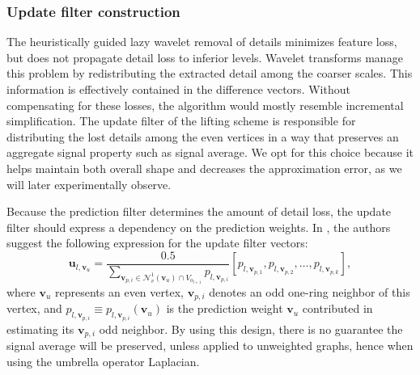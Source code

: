 \documentclass[graybox]{svmult}
\begin{document}
	
	\subsubsection{Update filter construction}
	The heuristically guided lazy wavelet removal of details minimizes feature loss, but does not propagate detail loss to inferior levels. Wavelet transforms manage this problem by redistributing the extracted detail among the coarser scales.  This information is effectively contained in the difference vectors. Without compensating for these losses, the algorithm would mostly resemble incremental simplification. The update filter of the lifting scheme is responsible for distributing the lost details among the even vertices in a way that preserves an aggregate signal property such as signal average. We opt for this choice because it helps maintain both overall shape and decreases the approximation error, as we will later experimentally observe. 
	
	Because the prediction filter determines the amount of detail loss, the update filter should express a dependency on the prediction weights. In \cite{Martinez2011}, the authors suggest the following expression for the update filter vectors:
	\begin{equation}
	\mathbf{u}_{l, \mathbf{v}_{u}} = \frac{0.5}{ \sum\limits_{\mathbf{v}_{p,i} \in \mathcal{N}_v^1(\mathbf{v}_u) \cap V_{o_{l+1}}} {  p_{l, \mathbf{v}_{p,i} } } } \left[ p_{l, \mathbf{v}_{p,1} }, p_{l, \mathbf{v}_{p,2} }, \ldots , p_{l, \mathbf{v}_{p,k} }\right],
	\label{eq_cds:smoothing_update_weights}
	\end{equation}
	where $\mathbf{v}_u$ represents an even vertex, $\mathbf{v}_{p,i}$ denotes an odd one-ring neighbor of this vertex, and $p_{l,\mathbf{v}_{p,i}} \equiv p_{l,\mathbf{v}_{p,i}}(\mathbf{v}_u)$ is the prediction weight $\mathbf{v}_u$ contributed in estimating its $\mathbf{v}_{p,i}$ odd neighbor.
	By using this design, there is no guarantee the signal average will be preserved, unless applied to unweighted graphs, hence when using the umbrella operator Laplacian.
	
\end{document}
